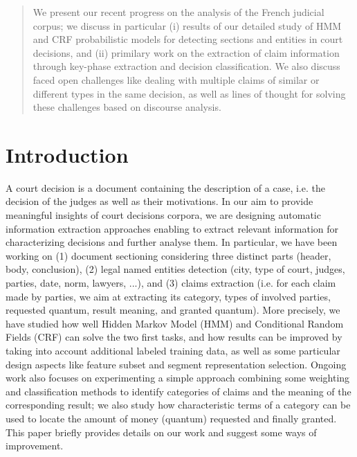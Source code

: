 \documentclass[runningheads,a4paper]{llncs}
\begin{document}
\begin{abstract}
We present our recent progress on the analysis of the French judicial corpus; we discuss in particular (i) results of our detailed study of HMM and CRF probabilistic models for detecting sections and entities in court decisions, and (ii) primilary work on the extraction of claim information through key-phase extraction and decision classification. We also discuss faced open challenges like dealing with multiple claims of similar or different types in the same decision, as well as lines of thought for solving these challenges based on discourse analysis.

\end{abstract}


\section{Introduction}

A court decision is a document containing the description of a case, i.e. the decision of the judges as well as their motivations. In our aim to provide meaningful insights of court decisions corpora, we are designing automatic information extraction approaches enabling to extract relevant information for characterizing decisions and further analyse them. In particular, we have been working on (1) document sectioning considering three distinct parts (header, body, conclusion), (2) legal named entities detection (city, type of court, judges, parties, date, norm, lawyers, ...), and (3) claims extraction (i.e. for each claim made by parties, we aim at extracting its category, types of involved parties, requested quantum, result meaning, and granted quantum).
More precisely, we have studied how well Hidden Markov Model (HMM) \cite{rabiner1989tutorial} and Conditional Random Fields (CRF) \cite{lafferty2001crfie} can solve the two first tasks, and how results can be improved by taking into account additional labeled training data, as well as some particular design aspects like feature subset and segment representation selection. Ongoing work also focuses on experimenting a simple approach combining some weighting and classification methods to identify categories of claims and the meaning of the corresponding result; we also study how characteristic terms of a category can be used to locate the amount of money (quantum) requested and finally granted. This paper briefly provides details on our work and suggest some ways of improvement.
\end{document}
